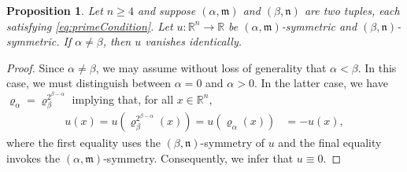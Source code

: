 \documentclass[10pt, reqno]{amsart}
\newcommand{\RR}{\mathbb{R}}
\newcommand{\m}{\mathfrak{m}}
\newcommand{\n}{\mathfrak{n}}
\numberwithin{equation}{section}
\theoremstyle{definition}
\theoremstyle{remark}
\theoremstyle{plain}
\newtheorem{prop}{Proposition}[section]
\begin{document}
	
	\begin{prop}\label{prop:distinct2}
		Let $n \ge 4$ and suppose $(\alpha, \m)$ and $(\beta, \n)$ are two tuples, each satisfying \eqref{eq:primeCondition}. Let $u : \RR^n \to \RR$ be $(\alpha,\m)$-symmetric and $(\beta,\n)$-symmetric. If $\alpha \ne \beta$, then $u$ vanishes identically.
	\end{prop}
	\begin{proof}
		Since $\alpha \ne \beta$, we may assume without loss of generality that $\alpha < \beta$. In this case, we must distinguish between $\alpha = 0$ and $\alpha > 0$. In the latter case, we have 
		\(
		\varrho_\alpha = \varrho_{\beta}^{2^{\beta-\alpha}}
		\)
		implying that, for all $x \in \RR^n$, 
		\begin{align*}
			u(x) = u(\varrho_{\beta}^{2^{\beta-\alpha}}(x))
			= u(\varrho_\alpha(x))
			&= -u(x),
		\end{align*}
		where the first equality uses the $(\beta,\n)$-symmetry of $u$ and the final equality invokes the $(\alpha,\m)$-symmetry. Consequently, we infer that $u \equiv 0$.
		

\end{proof}
\end{document}
